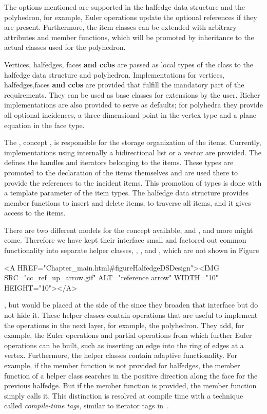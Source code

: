 The options mentioned are supported in the halfedge data structure and the
polyhedron, for example, Euler operations update the optional
references if they are present. Furthermore, the item classes can be
extended with arbitrary attributes and member functions, which will be
promoted by inheritance to the actual classes used for the polyhedron.


Vertices, halfedges, faces {\bf\ttfamily and ccbs} are passed as local types of the
 class to the halfedge data structure and polyhedron.
Implementations for vertices, halfedges,faces {\bf\ttfamily and ccbs} are provided that
fulfill the mandatory part of the requirements. They can be used as
base classes for extensions by the user. Richer implementations are
also provided to serve as defaults; for polyhedra they provide all
optional incidences, a three-dimensional point in the vertex type and
a plane equation in the face type.

The , concept , is
responsible for the storage organization of the items. Currently,
implementations using internally a bidirectional list or a
vector are provided. The  defines the handles and iterators
belonging to the items. These types are promoted to the declaration of
the items themselves and are used there to provide the references to
the incident items. This promotion of types is done with a template
parameter  of the item types.  The halfedge data structure
provides member functions to insert and delete items, to traverse all
items, and it gives access to the items.

There are two different models for the  concept available,
 and , and more might come.
Therefore we have kept their interface small and factored out common
functionality into separate helper classes, ,
, and ,
which are not shown in
Figure~\ccTexHtml{\ref{figureHalfedgeDSDesign}}{}\begin{ccHtmlOnly} <A
HREF="Chapter_main.html#figureHalfedgeDSDesign"><IMG
SRC="cc_ref_up_arrow.gif" ALT="reference arrow" WIDTH="10"
HEIGHT="10"></A>
\end{ccHtmlOnly}, but would be placed at the side of the 
since they broaden that interface but do not hide it.  These helper
classes contain operations that are useful to implement the operations
in the next layer, for example, the polyhedron. They add, for example,
the Euler operations and partial operations from which further Euler
operations can be built, such as inserting an edge into the ring of
edges at a vertex.  Furthermore, the helper classes contain adaptive
functionality.  For example, if the  member function is
not provided for halfedges, the  member function of
a helper class searches in the positive direction along the face for
the previous halfedge. But if the  member function is
provided, the  member function simply calls it. This
distinction is resolved at compile time with a technique called {\em
compile-time tags}, similar to iterator tags in~\cite{cgal:sl-stl-95}.

